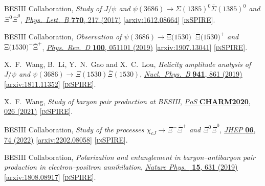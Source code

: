 \documentclass[a4paper,11pt]{article}
\begin{document}
\begin{thebibliography}{**}
 BESIII Collaboration, 
\textit{Study of $J/\psi$ and $\psi(3686)\rightarrow\Sigma(1385)^{0}\bar\Sigma(1385)^{0}$ and $\Xi^0\bar\Xi^{0}$},
\href{https://www.sciencedirect.com/science/article/pii/S0370269317303222?via%3Dihub}{\textit{Phys.\ Lett.\ B} {\bf 770}, 217 (2017)}
[\textcolor{blue}{\href{https://arxiv.org/pdf/1612.08664.pdf}{arxiv:1612.08664}}] 
[\textcolor{blue}{\href{https://inspirehep.net/literature/1506414}{\textsc{inSPIRE}}}].


 BESIII Collaboration, 
\textit{Observation of $\ensuremath{\psi}(3686)\ensuremath{\rightarrow}\mathrm{\ensuremath{\Xi}}(1530{)}^{\ensuremath{-}}\overline{\mathrm{\ensuremath{\Xi}}}(1530{)}^{+}$ and $\mathrm{\ensuremath{\Xi}}(1530{)}^{\ensuremath{-}}{\overline{\mathrm{\ensuremath{\Xi}}}}^{+}$},
\href{https://journals.aps.org/prd/abstract/10.1103/PhysRevD.100.051101}{\textit{Phys.\ Rev.\ D }{\bf 100}, 051101 (2019)}
[\textcolor{blue}{\href{https://arxiv.org/pdf/1907.13041.pdf}{arxiv:1907.13041}}] 
[\textcolor{blue}{\href{https://inspirehep.net/literature/1747092}{\textsc{inSPIRE}}}].


 X.~F.~Wang, B.~Li, Y.~N.~Gao and X.~C.~Lou,  
\textit{Helicity amplitude analysis of $J/\psi$ and $\psi(3686)\to\Xi(1530)\bar{\Xi}(1530)$}, 
\href{https://www.sciencedirect.com/science/article/pii/S0550321319300689?via%3Dihub}{\textit{Nucl.\ Phys.\ B} {\bf 941}, 861 (2019)}
[\textcolor{blue}{\href{https://arxiv.org/pdf/1811.11352.pdf}{arxiv:1811.11352}}] 
[\textcolor{blue}{\href{https://inspirehep.net/literature/1705667}{\textsc{inSPIRE}}}].

X.~F.~Wang, \textit{Study of baryon pair production at BESIII}, 
\href{https://pos.sissa.it/385/026}{\textit{PoS }\textbf{CHARM2020}, 026 (2021)}
[\textcolor{blue}{\href{https://inspirehep.net/literature/1926588}{\textsc{inSPIRE}}}].

BESIII Collaboration,
\textit{Study of the processes $\chi_{cJ} \to \Xi^- \bar{\Xi}^+$ and $\Xi^0 \bar{\Xi}^0$},
\href{https://link.springer.com/article/10.1007/JHEP06(2022)074}{\textit{JHEP} \textbf{06}, 74 (2022)}
[\textcolor{blue}{\href{https://arxiv.org/pdf/2202.08058.pdf}{arxiv:2202.08058}}] 
[\textcolor{blue}{\href{https://inspirehep.net/literature/2033855}{\textsc{inSPIRE}}}].

 BESIII Collaboration,
\textit{Polarization and entanglement in baryon–antibaryon pair production in electron–positron annihilation}, \href{https://www.nature.com/articles/s41567-019-0494-8/}{\textit{Nature Phys.\ }  {\bf 15}, 631 (2019)}
[\textcolor{blue}{\href{https://arxiv.org/pdf/1808.08917.pdf}{arxiv:1808.08917}}] 
[\textcolor{blue}{\href{https://inspirehep.net/literature/1691850}{\textsc{inSPIRE}}}].


\end{thebibliography}
\end{document}
